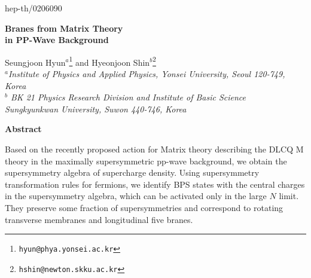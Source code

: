 \documentclass[a4paper,12pt]{article}
\begin{document}
\renewcommand{\thefootnote}{\fnsymbol{footnote}}

\begin{titlepage}
\hfill{hep-th/0206090}
\vspace{15mm}
\baselineskip 8mm

\begin{center}
{\LARGE \bf Branes from Matrix Theory \\
in PP-Wave Background }
\end{center}
\baselineskip 6mm
\vspace{10mm}
\begin{center}
Seungjoon Hyun$^a$\footnote{\tt hyun@phya.yonsei.ac.kr} and
Hyeonjoon Shin$^b$\footnote{\tt hshin@newton.skku.ac.kr} \\[5mm]
{\it
$^a$Institute of Physics and Applied Physics, Yonsei University,
Seoul 120-749, Korea \\
$^b$ BK 21 Physics Research Division and Institute of Basic Science \\
Sungkyunkwan University, Suwon 440-746, Korea}
\end{center}

\thispagestyle{empty}


\vfill

\begin{center}
{\bf Abstract}
\end{center}
\noindent Based on the recently proposed action for Matrix theory
describing the DLCQ M theory in the maximally supersymmetric
pp-wave background, we obtain the supersymmetry algebra of
supercharge density.  Using supersymmetry transformation rules for
fermions, we identify BPS states with the central charges in the
supersymmetry algebra, which can be activated only in the large
$N$ limit. They preserve some fraction of supersymmetries and
correspond to rotating transverse membranes and longitudinal five
branes.

\vspace{20mm}
\end{titlepage}

\baselineskip 6.5mm
\renewcommand{\thefootnote}{\arabic{footnote}}
\setcounter{footnote}{0}
\end{document}
